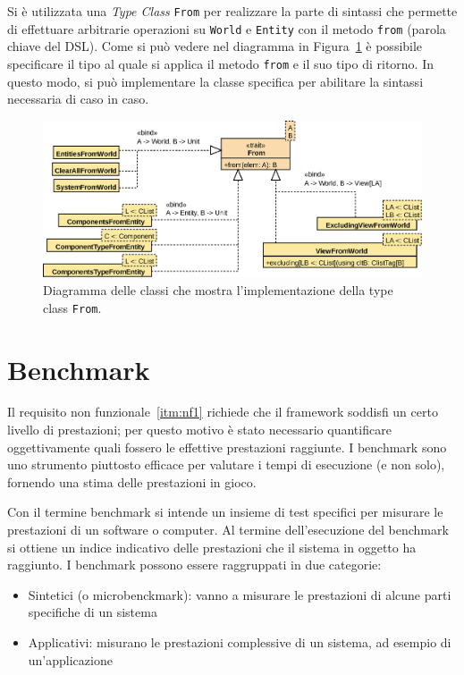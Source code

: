 

Si è utilizzata una \textit{Type Class} \texttt{From} per realizzare la parte di sintassi che permette di effettuare
arbitrarie operazioni su \texttt{World} e \texttt{Entity} con il metodo \texttt{from} (parola chiave del DSL).
Come si può vedere nel diagramma in Figura~\ref{fig:from} è possibile specificare il tipo al quale si applica il metodo
\texttt{from} e il suo tipo di ritorno.
In questo modo, si può implementare la classe specifica per abilitare la sintassi necessaria di caso in caso.

\begin{figure}[H]
    \centering
    \includegraphics[width=\textwidth]{./img/From}
    \caption{Diagramma delle classi che mostra l'implementazione della type class \texttt{From}.}
    \label{fig:from}
\end{figure}

\section{Benchmark}\label{sec:benchmark}
Il requisito non funzionale~\ref{itm:nf1} richiede che il framework soddisfi un certo livello di prestazioni;
per questo motivo è stato necessario quantificare oggettivamente quali fossero le effettive prestazioni raggiunte.
I benchmark sono uno strumento piuttosto efficace per valutare i tempi di esecuzione (e non solo), fornendo
una stima delle prestazioni in gioco.

Con il termine benchmark si intende un insieme di test specifici per misurare le prestazioni di un software o computer.
Al termine dell'esecuzione del benchmark si ottiene un indice indicativo delle prestazioni che il sistema in oggetto ha
raggiunto.
I benchmark possono essere raggruppati in due categorie:
\begin{itemize}
    \item Sintetici (o microbenckmark): vanno a misurare le prestazioni di alcune parti specifiche di un sistema
    \item Applicativi: misurano le prestazioni complessive di un sistema, ad esempio di un'applicazione
\end{itemize}


